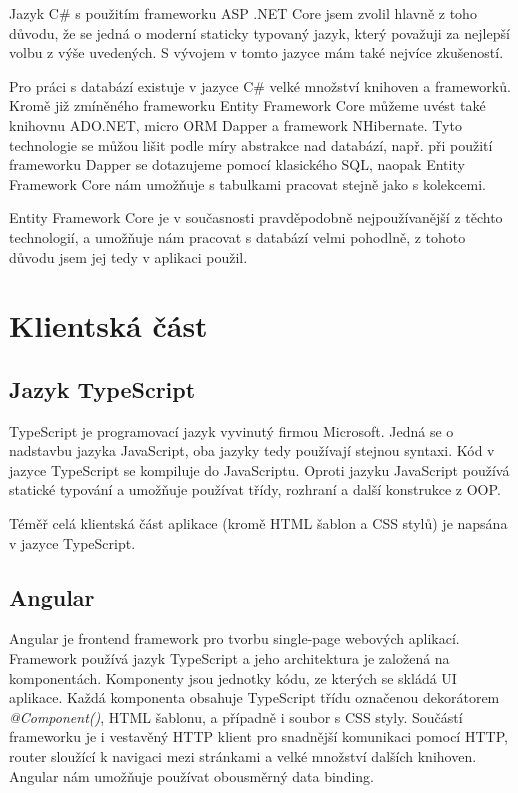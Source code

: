 Jazyk C\# s použitím frameworku ASP .NET Core jsem zvolil hlavně z toho důvodu, že se jedná o moderní staticky typovaný jazyk, který považuji za nejlepší volbu z výše uvedených. S vývojem v tomto jazyce mám také nejvíce zkušeností. 

Pro práci s databází existuje v jazyce C\# velké množství knihoven a frameworků. Kromě již zmíněného frameworku Entity Framework Core můžeme uvést také knihovnu ADO.NET, micro ORM Dapper a framework NHibernate. 
Tyto technologie se můžou lišit podle míry abstrakce nad databází, např. při použití frameworku Dapper se dotazujeme pomocí klasického SQL, naopak Entity Framework Core nám umožňuje s tabulkami pracovat stejně jako s kolekcemi.

Entity Framework Core je v současnosti pravděpodobně nejpoužívanější z těchto technologií, a umožňuje nám pracovat s databází velmi pohodlně, z tohoto důvodu jsem jej tedy v aplikaci použil. 

\section{Klientská část}

\subsection{Jazyk TypeScript}
TypeScript je programovací jazyk vyvinutý firmou Microsoft. Jedná se o nadstavbu jazyka JavaScript, oba jazyky tedy používají stejnou syntaxi. Kód v jazyce TypeScript se kompiluje do JavaScriptu.
Oproti jazyku JavaScript používá statické typování a umožňuje používat třídy, rozhraní a další konstrukce z OOP. 
\cite{TypescriptDocs}

Téměř celá klientská část aplikace (kromě HTML šablon a CSS stylů) je napsána v jazyce TypeScript.

\subsection{Angular}
Angular je frontend framework pro tvorbu single-page webových aplikací. Framework používá jazyk TypeScript a jeho architektura je založená na komponentách.
Komponenty jsou jednotky kódu, ze kterých se skládá UI aplikace. Každá komponenta obsahuje TypeScript třídu označenou dekorátorem \textit{@Component()}, HTML šablonu, a případně i soubor s CSS styly. 
Součástí frameworku je i vestavěný HTTP klient pro snadnější komunikaci pomocí HTTP, router sloužící k navigaci mezi stránkami a velké množství dalších knihoven. Angular nám umožňuje používat obousměrný data binding.
\cite{AngularDocs}

